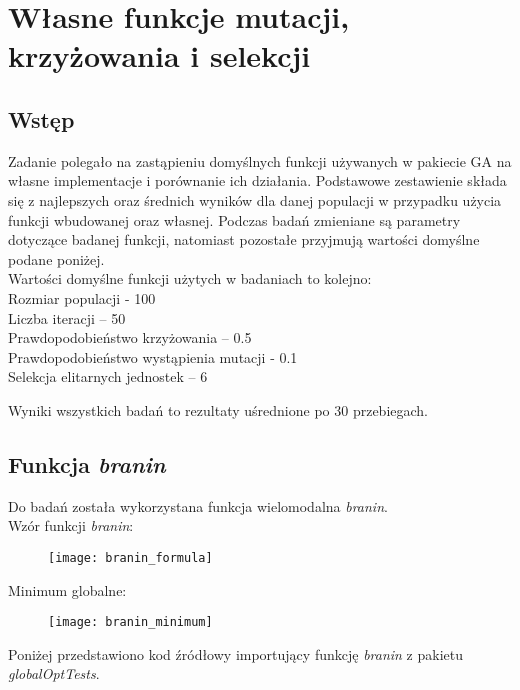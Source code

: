 \section{Własne funkcje mutacji, krzyżowania i selekcji}


\subsection{Wstęp}
Zadanie polegało na zastąpieniu domyślnych funkcji używanych w pakiecie GA na własne implementacje i porównanie ich działania. Podstawowe zestawienie składa się z najlepszych oraz średnich wyników dla danej populacji w przypadku użycia funkcji wbudowanej oraz własnej. Podczas badań zmieniane są parametry dotyczące badanej funkcji, natomiast pozostałe przyjmują wartości domyślne podane poniżej.\\

Wartości domyślne funkcji użytych w badaniach to kolejno:\\
Rozmiar populacji - 100\\
Liczba iteracji – 50\\
Prawdopodobieństwo krzyżowania – 0.5\\
Prawdopodobieństwo wystąpienia mutacji - 0.1\\
Selekcja elitarnych jednostek – 6\\
\newline

Wyniki wszystkich badań to rezultaty uśrednione po 30 przebiegach.\\
\newline

\subsection{Funkcja \textit{branin}}
Do badań została wykorzystana funkcja wielomodalna \textit{branin}.\\

Wzór funkcji \textit{branin}:
\begin{figure}[H]
	\centering
	\texttt{[image: branin\_formula]} 
	\label{rys:branin_formula} 
\end{figure}

Minimum globalne:
\begin{figure}[H]
	\centering
	\texttt{[image: branin\_minimum]}
	\label{rys:branin_minimum} 
\end{figure}

Poniżej przedstawiono kod źródłowy importujący funkcję \textit{branin} z pakietu \textit{globalOptTests}.\\

